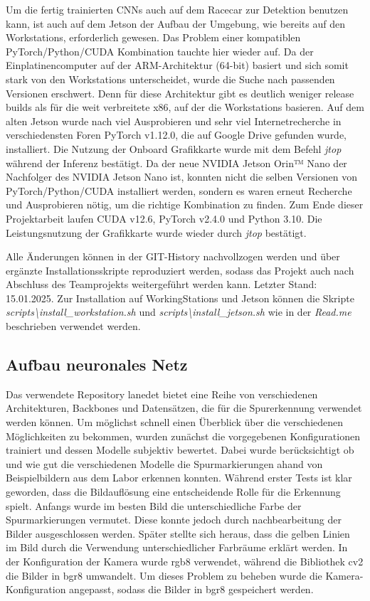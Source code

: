 \documentclass{article}
\begin{document}
            Um die fertig trainierten CNNs auch auf dem Racecar zur Detektion benutzen kann, ist auch auf dem Jetson der Aufbau der Umgebung, wie bereits auf den Workstations, erforderlich gewesen. Das Problem einer kompatiblen PyTorch/Python/CUDA Kombination tauchte hier wieder auf. Da der Einplatinencomputer auf der ARM-Architektur (64-bit) basiert und sich somit stark von den Workstations unterscheidet, wurde die Suche nach passenden Versionen erschwert. Denn für diese Architektur gibt es deutlich weniger release builds als für die weit verbreitete x86, auf der die Workstations basieren.
            Auf dem alten Jetson wurde nach viel Ausprobieren und sehr viel Internetrecherche in verschiedensten Foren PyTorch v1.12.0, die auf Google Drive gefunden wurde, installiert. Die Nutzung der Onboard Grafikkarte wurde mit dem Befehl \textit{jtop} während der Inferenz bestätigt.
            Da der neue NVIDIA Jetson Orin™ Nano der Nachfolger des NVIDIA Jetson Nano ist, konnten nicht die selben Versionen von PyTorch/Python/CUDA installiert werden, sondern es waren erneut Recherche und Ausprobieren nötig, um die richtige Kombination zu finden. Zum Ende dieser Projektarbeit laufen CUDA v12.6, PyTorch v2.4.0 und Python 3.10. Die Leistungsnutzung der Grafikkarte wurde wieder durch \textit{jtop} bestätigt.

            Alle Änderungen können in der GIT-History nachvollzogen werden und über ergänzte Installationsskripte reproduziert werden, sodass das Projekt auch nach Abschluss des Teamprojekts weitergeführt werden kann. Letzter Stand: 15.01.2025. %
            Zur Installation auf WorkingStations und Jetson können die Skripte \textit{scripts\textbackslash install\_workstation.sh} und \textit{scripts\textbackslash install\_jetson.sh} wie in der \textit{Read.me} beschrieben verwendet werden.

        \subsection{Aufbau neuronales Netz}
            Das verwendete Repository lanedet bietet eine Reihe von verschiedenen Architekturen, Backbones und Datensätzen, die für die Spurerkennung verwendet werden können.
            Um möglichst schnell einen Überblick über die verschiedenen Möglichkeiten zu bekommen, wurden zunächst die vorgegebenen Konfigurationen trainiert und dessen Modelle subjektiv bewertet.
            Dabei wurde berücksichtigt ob und wie gut die verschiedenen Modelle die Spurmarkierungen ahand von Beispielbildern aus dem Labor erkennen konnten.
            Während erster Tests ist klar geworden, dass die Bildauflösung eine entscheidende Rolle für die Erkennung spielt. Anfangs wurde im besten Bild die unterschiedliche Farbe der Spurmarkierungen vermutet. Diese konnte jedoch durch nachbearbeitung der Bilder ausgeschlossen werden. Später stellte sich heraus, dass die gelben Linien im Bild durch die Verwendung unterschiedlicher Farbräume erklärt werden. In der Konfiguration der Kamera wurde rgb8 verwendet, während die Bibliothek cv2 die Bilder in bgr8 umwandelt. Um dieses Problem zu beheben wurde die Kamera-Konfiguration angepasst, sodass die Bilder in bgr8 gespeichert werden.
\end{document}
